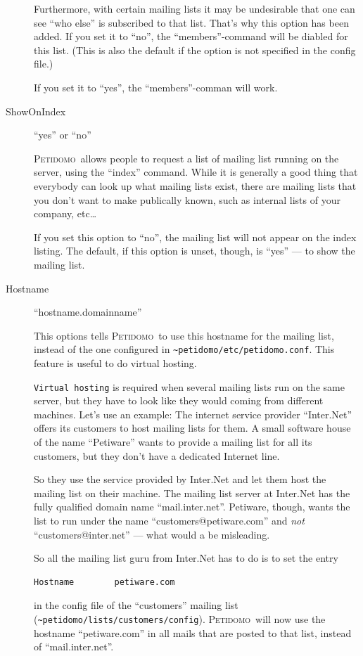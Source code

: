\documentclass[a4paper]{report}
\newcommand{\Petidomo}{{\scshape Peti\-domo}}
\newcommand{\DefNI}[1]{{\tt #1}}
\newcommand{\file}[1]{{\tt #1}}
\begin{document}
\begin{description}
Furthermore, with certain mailing lists it may be undesirable that one
can see ``who else'' is subscribed to that list. That's why this
option has been added. If you set it to ``no'', the
``members''-command will be diabled for this list. (This is also the
default if the option is not specified in the config file.)

If you set it to ``yes'', the ``members''-comman will work.

\item[ShowOnIndex]  \hfill ``yes'' or ``no''

\Petidomo\ allows people to request a list of mailing list running on
the server, using the ``index'' command. While it is generally a good
thing that everybody can look up what mailing lists exist, there are
mailing lists that you don't want to make publically known, such as
internal lists of your company, etc\dots{}

If you set this option to ``no'', the mailing list will not appear on
the index listing. The default, if this option is unset, though, is
``yes'' --- to show the mailing list.


\item[Hostname] \hfill ``hostname.domainname''

This options tells \Petidomo\ to use this hostname for the mailing
list, instead of the one configured in
\file{\~{}petidomo/etc/petidomo.conf}. This feature is useful to do
virtual hosting.

\DefNI{Virtual hosting} is required when
several mailing lists run on the same server, but they have to look
like they would coming from different machines. Let's use an example:
The internet service provider ``Inter.Net'' offers its customers to
host mailing lists for them. A small software house of the name
``Petiware'' wants to provide a mailing list for all its customers,
but they don't have a dedicated Internet line.

So they use the service provided by Inter.Net and let them host the
mailing list on their machine. The mailing list server at Inter.Net
has the fully qualified domain name ``mail.inter.net''. Petiware,
though, wants the list to run under the name
``customers@petiware.com'' and \emph{not} ``customers@inter.net'' ---
what would a be misleading.

So all the mailing list guru from Inter.Net has to do is to set the
entry
\begin{verbatim}
Hostname        petiware.com
\end{verbatim}
in the config file of the ``customers'' mailing list
(\file{\~{}peti\-domo/lists/cu\-stomers/config}). \Petidomo\ will now use the
hostname ``peti\-ware.com'' in all mails that are posted to that list,
instead of ``mail.inter.net''.


\end{description}
\end{document}
